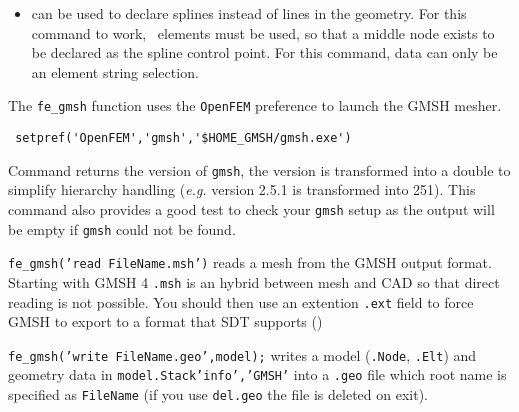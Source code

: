 \begin{itemize}
\item {} can be used to declare splines instead of lines in the geometry. For this command to work, ~elements must be used, so that a middle node exists to be declared as the spline control point.
For this command, data can only be an element string selection.
\end{itemize}


The {\tt fe\_gmsh} function uses the {\tt OpenFEM} preference to launch the GMSH mesher.

\begin{verbatim}
 setpref('OpenFEM','gmsh','$HOME_GMSH/gmsh.exe')
\end{verbatim}


Command  returns the version of {\tt gmsh}, the version is transformed into a double to simplify hierarchy handling ({\it e.g.} version 2.5.1 is transformed into 251).
This command also provides a good test to check your {\tt gmsh} setup as the output will be empty if {\tt gmsh} could not be found.


{\tt fe\_gmsh('read FileName.msh')} reads a mesh from the GMSH output format. Starting with GMSH 4 {\tt .msh} is an hybrid between mesh and CAD so that direct reading is not possible. You should then use an extention {\tt .ext} field to force GMSH to export to a format that SDT supports ()


{\tt fe\_gmsh('write FileName.geo',model);} writes a model ({\tt .Node}, {\tt .Elt}) and geometry data in {\tt model.Stack{'info','GMSH'}} into a {\tt .geo} file which root name is specified as {\tt FileName} (if you use {\tt del.geo} the file is deleted on exit). 

